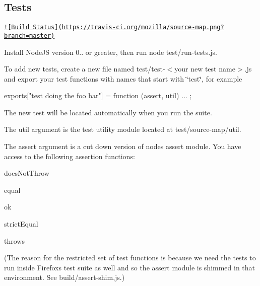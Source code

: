 \subsection*{Tests}

\href{https://travis-ci.org/mozilla/source-map}{\tt !\mbox{[}Build Status\mbox{]}(https\+://travis-\/ci.\+org/mozilla/source-\/map.\+png?branch=master)}

Install Node\+J\+S version 0.. or greater, then run {\ttfamily node test/run-\/tests.\+js}.

To add new tests, create a new file named {\ttfamily test/test-\/$<$your new test name$>$.js} and export your test functions with names that start with \char`\"{}test\char`\"{}, for example \begin{DoxyVerb}exports["test doing the foo bar"] = function (assert, util) {
  ...
};
\end{DoxyVerb}


The new test will be located automatically when you run the suite.

The {\ttfamily util} argument is the test utility module located at {\ttfamily test/source-\/map/util}.

The {\ttfamily assert} argument is a cut down version of node\textquotesingle{}s assert module. You have access to the following assertion functions\+:


\begin{DoxyItemize}
\item {\ttfamily does\+Not\+Throw}
\item {\ttfamily equal}
\item {\ttfamily ok}
\item {\ttfamily strict\+Equal}
\item {\ttfamily throws}
\end{DoxyItemize}

(The reason for the restricted set of test functions is because we need the tests to run inside Firefox\textquotesingle{}s test suite as well and so the assert module is shimmed in that environment. See {\ttfamily build/assert-\/shim.\+js}.) 